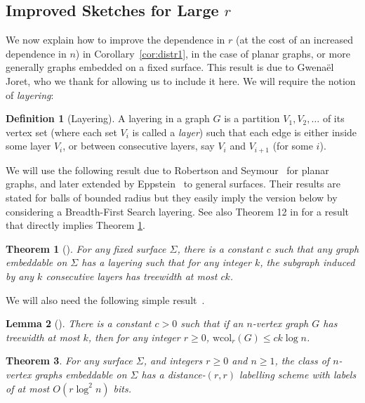 \documentclass[11pt]{article}
\newtheorem{thm}{Theorem}[section]
\newtheorem{lemma}[thm]{Lemma}
\theoremstyle{definition}
\newtheorem{definition}{Definition}
\newcommand{\wcol}{\mathrm{wcol}}
\renewcommand{\le}{\leqslant}
\renewcommand{\ge}{\geqslant}
\begin{document}
\subsection{Improved Sketches for Large $r$}
\label{section:large r}

We now explain how to improve the dependence in $r$ (at the cost of an increased dependence in $n$)
in Corollary~\ref{cor:distr1}, in the case of planar graphs, or more generally graphs embedded on a
fixed surface. This result is due to Gwena\"el Joret, who we thank for allowing us to include it
here.
We will require the notion of \emph{layering}:

\begin{definition}[Layering]
A layering in a graph $G$ is a partition $V_1, V_2,\ldots$ of its vertex set (where each set $V_i$
is called a \emph{layer}) such that each edge is either inside some layer $V_i$, or between
consecutive layers, say $V_i$ and $V_{i+1}$ (for some $i$).
\end{definition}
\noindent
We will use the following result due to Robertson and Seymour~\cite{RS84} for planar graphs, and
later extended by Eppstein~\cite{Epp00} to general surfaces. Their
results are stated for  balls of bounded
radius but they easily imply the version
below by considering a Breadth-First Search layering. See also Theorem 12 in \cite{DMW17} for a result that
directly implies Theorem \ref{thm:lay}.

\begin{thm}[\cite{Epp00,RS84}]\label{thm:lay}
For any fixed surface $\Sigma$, there is a constant $c$ such that any
graph embeddable on $\Sigma$ has a layering such that for any integer
$k$, the subgraph induced by any $k$ consecutive layers has treewidth
at most $ck$.
\end{thm}

\noindent
We will also need the following simple result~\cite[Corollary
6.1]{NO12}.


\begin{lemma}[\cite{NO12}]\label{lem:tw}
There is a constant $c>0$ such that if an $n$-vertex graph $G$ has treewidth at most  $k$, then  for
any integer $r\ge 0$, $\wcol_r(G)\le c k\log n$.
\end{lemma}

\begin{thm}\label{thm:distr2}
For any surface $\Sigma$, and integers $r\ge 0$ and $n\ge 1$, the
class of $n$-vertex graphs embeddable on $\Sigma$ has a distance-$(r,r)$
labelling scheme with labels of at most  $O(r \log^2
n)$ bits. 
\end{thm}
\end{document}
